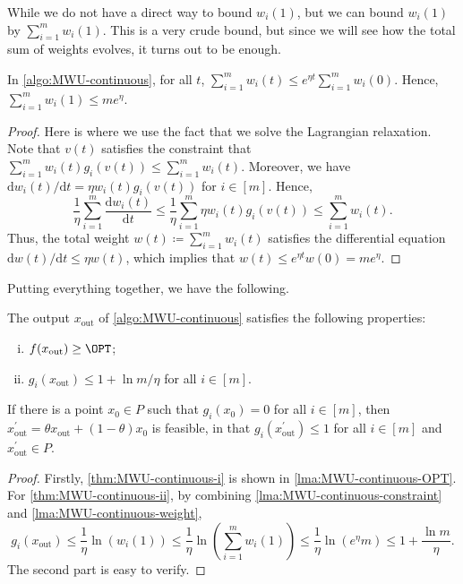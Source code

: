 While we do not have a direct way to bound \(w_i(1)\), but we can bound \(w_i(1)\) by \(\sum_{i=1}^{m} w_i(1)\). This is a very crude bound, but since we will see how the total sum of weights evolves, it turns out to be enough.

\begin{lemma}\label{lma:MWU-continuous-weight}
	In \autoref{algo:MWU-continuous}, for all \(t\), \(\sum_{i=1}^{m} w_i(t) \leq e^{\eta t} \sum_{i=1}^{m} w_i(0)\). Hence, \(\sum_{i=1}^{m} w_i(1) \leq m e^\eta \).
\end{lemma}
\begin{proof}
	Here is where we use the fact that we solve the Lagrangian relaxation. Note that \(v(t)\) satisfies the constraint that \(\sum_{i=1}^{m} w_i(t) g_i(v(t)) \leq \sum_{i=1}^{m} w_i(t)\). Moreover, we have \(\mathrm{d} w_i(t) / \mathrm{d} t = \eta w_i(t) g_i(v(t))\) for \(i \in [m]\). Hence,
	\[
		\frac{1}{\eta } \sum_{i=1}^{m} \frac{\mathrm{d}w_i(t)}{\mathrm{d}t}
		\leq \frac{1}{\eta } \sum_{i=1}^{m} \eta w_i(t) g_i(v(t))
		\leq \sum_{i=1}^{m} w_i(t).
	\]
	Thus, the total weight \(w(t) \coloneqq \sum_{i=1}^{m} w_i(t)\) satisfies the differential equation \(\mathrm{d} w(t) / \mathrm{d} t \leq \eta w(t) \), which implies that \(w(t) \leq e^{\eta t} w(0) = m e^\eta\).
\end{proof}

Putting everything together, we have the following.

\begin{theorem}\label{thm:MWU-continuous}
	The output \(x_{\text{out} }\) of \autoref{algo:MWU-continuous} satisfies the following properties:
	\begin{enumerate}[(i)]
		\item\label{thm:MWU-continuous-i} \(f(x_{\text{out} }) \geq \OPT\);
		\item\label{thm:MWU-continuous-ii} \(g_i(x_{\text{out} }) \leq 1 + \ln m / \eta \) for all \(i \in [m]\).
	\end{enumerate}
	If there is a point \(x_0 \in P\) such that \(g_i(x_0) = 0\) for all \(i \in [m]\), then \(x_{\text{out} }^{\prime} = \theta x_{\text{out} } + (1 - \theta ) x_0\) is feasible, in that \(g_i(x_{\text{out} }^{\prime} ) \leq 1\) for all \(i \in [m]\) and \(x_{\text{out} }^{\prime} \in P\).
\end{theorem}
\begin{proof}
	Firstly, \autoref{thm:MWU-continuous-i} is shown in \autoref{lma:MWU-continuous-OPT}. For \autoref{thm:MWU-continuous-ii}, by combining \autoref{lma:MWU-continuous-constraint} and \autoref{lma:MWU-continuous-weight},
	\[
		g_i(x_{\text{out} })
		\leq \frac{1}{\eta } \ln (w_i(1))
		\leq \frac{1}{\eta } \ln (\sum_{i=1}^{m} w_i(1))
		\leq \frac{1}{\eta } \ln (e^\eta m)
		\leq 1 + \frac{\ln m}{\eta }.
	\]
	The second part is easy to verify.
\end{proof}

